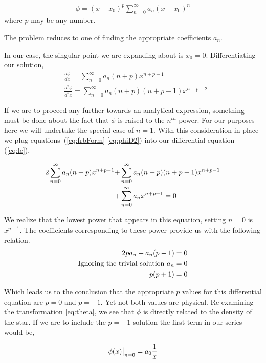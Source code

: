 \documentclass[12pt, manuscript]{article}
\begin{document}
\begin{align}
\phi = (x-x_{0})^{p}\sum_{n=0}^{\infty}a_{n}(x-x_{0})^{n}\label{eq:frbForm}
\end{align}
where $p$ may be any number. \par

The problem reduces to one of finding the appropriate coefficients $a_{n}$.\par

In our case, the singular point we are expanding about is $x_{0}=0$. Differentiating our solution,
\begin{align}
&\frac{d\phi}{dx} = \sum_{n=0}^{\infty}a_{n}(n+p)x^{n+p-1}\label{eq:phiD1}\\
&\frac{d^{2}\phi}{d^{2}x} = \sum_{n=0}^{\infty}a_{n}(n+p)(n+p-1)x^{n+p-2}\label{eq:phiD2}
\end{align}

If we are to proceed any further towards an analytical expression, something must be done about the fact that $\phi$ is raised to the $n^{th}$ power. For our purposes here we will undertake the special case of $n=1$. With this consideration in place we plug equations~(\eqref{eq:frbForm}-\eqref{eq:phiD2}) into our differential equation (\eqref{eq:le}),

\begin{align}
2 \sum_{n=0}^{\infty}a_{n}(n+p)x^{n+p-1}+ &\sum_{n=0}^{\infty}a_{n}(n+p)(n+p-1)x^{n+p-1}\\ +&\sum_{n=0}^{\infty}a_{n}x^{n+p+1} =0\notag
\end{align}

We realize that the lowest power that appears in this equation, setting $n=0$ is $x^{p-1}$. The coefficients corresponding to these power provide us with the following relation.
\begin{align}
2pa_{n}+a_{n}(p-1) = 0\notag\\
\text{Ignoring the trivial solution $a_{n}=0$}\notag\\
p(p+1) = 0
\end{align}

Which leads us to the conclusion that the appropriate $p$ values for this differential equation are $p=0$  and $p=-1$. Yet not both values are physical. Re-examining the transformation \eqref{eq:theta}, we see that $\phi$ is directly related to the density of the star. If we are to include the $p=-1$ solution the first term in our series would be,

\begin{align}
\phi(x)\big|_{n=0}=a_{0}\frac{1}{x}\notag
\end{align}
\end{document}
